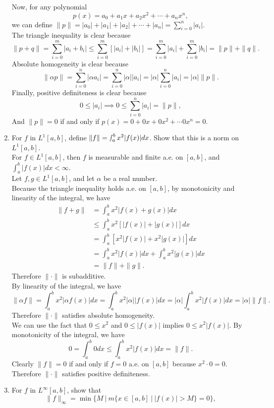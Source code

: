 \begin{enumerate}
	Now, for any polynomial
	\[
		p(x) = a_0+a_1x+a_2x^2+\cdots+a_nx^n,	
	\]
	we can define $\|p\| = |a_0|+|a_1|+|a_2|+\cdots+|a_n| = \sum_{i=0}^n|a_i|$.\\
	The triangle inequality is clear because 
	\[
		\|p+q\| = \sum_{i=0}^{m}|a_i+b_i|\le\sum_{i=0}^{m}[|a_i|+|b_i|]=\sum_{i=0}^{m}|a_i|+\sum_{i=0}^{m}|b_i|=\|p\|+\|q\|.
	\]
	Absolute homogeneity is clear because
	\[
		\|\alpha p\| = \sum_{i=0}^n|\alpha a_i|= \sum_{i=0}^n|\alpha|| a_i|=|\alpha|\sum_{i=0}^n| a_i|=|\alpha|\|p\|.
	\]
	Finally, positive definiteness is clear because
	\[
		0 \le |a_i| \implies 0\le \sum_{i=0}^n| a_i|=\|p\|,
	\]
	And $\|p\|=0$ if and only if $p(x)= 0+0x+0x^2+\cdots0x^n=0$.
	\item For $f$ in $L^1[a,b]$, define $\|f\| = \smallint_a^b x^2 |f(x)|dx$.
	Show that this is a norm on $L^1[a,b]$.\\
	For $f\in L^1[a,b]$, then $f$ is measurable and finite a.e. on $[a,b]$, and $\int_a^b|f(x)|dx<\infty$.\\
	Let $f,g\in L^1[a,b]$, and let $\alpha$ be a real number.\\
	Because the triangle inequality holds a.e. on $[a,b]$, by monotonicity and linearity of the integral, we have
	\begin{align*}
	\|f+g\|&=\int_a^b x^2 |f(x)+g(x)|dx\\
	&\le\int_a^b x^2 [|f(x)|+|g(x)|]dx\\
	&=\int_a^b [x^2 |f(x)|+x^2|g(x)|]dx\\
	&=\int_a^b x^2 |f(x)|dx+\int_a^b x^2 |g(x)|dx\\
	&= \|f\|+\|g\|.	
	\end{align*}
	Therefore $\|\cdot\|$ is subadditive.\\
	By linearity of the integral, we have
	\[
	\|\alpha f\| = \int_a^bx^2|\alpha f(x)|dx = \int_a^bx^2|\alpha| |f(x)|dx=|\alpha |\int_a^bx^2 |f(x)|dx	=|\alpha |\|f\|.
	\]
	Therefore $\|\cdot\|$ satisfies absolute homogeneity.\\
	We can use the fact that $0\le x^2$ and $0\le |f(x)|$ implies $0\le x^2|f(x)|$.
	By monotonicity of the integral, we have
	\[
	0=\int_a^b0dx \le \int_a^bx^2|f(x)|dx = \|f\|.
	\]
	Clearly $\|f\|=0$ if and only if $f=0$ a.e. on $[a,b]$ because $x^2\cdot 0 = 0$.\\
	Therefore $\|\cdot \|$ satisfies positive definiteness.
	\item For $f$ in $L^\infty[a,b]$, show that 
	\[
	\| f\|_\infty = \min \biggl \{ M \ \biggl |\ m \{x \in [a,b]\ |\ |f(x)| > M \} =0 \biggr \},
	\] 
	\\

\end{enumerate}
